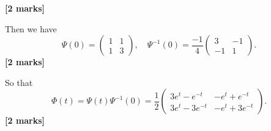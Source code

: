 \documentclass[11pt,a4paper]{article}
\newcommand{\mrk}[1]{\hfill\textbf{[#1 marks]}}
\begin{document}
\begin{enumerate}
		\mrk{2}\par
		Then we have
		$$
		\Psi(0) =
		\begin{pmatrix}
			1 & 1\\
			1 & 3
		\end{pmatrix},\quad
		\Psi^{-1}(0) = \frac{-1}{4}
		\begin{pmatrix}
			3 & -1\\
			-1 & 1
		\end{pmatrix}.
		$$
		\mrk{2}\par
		So that
		$$
		\Phi (t) = \Psi(t)\Psi^{-1}(0) = \frac{1}{2}
		\begin{pmatrix}
			3e^t - e^{-t} & -e^t + e^{-t}\\
			3e^t - 3e^{-t} & -e^t + 3e^{-t}
		\end{pmatrix}.
		$$
		\mrk{2}
	\end{enumerate}
\end{document}
